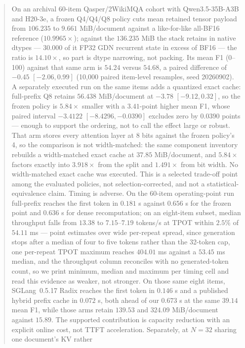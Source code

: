 \documentclass{article}
\begin{document}
\begin{abstract}
On an archival 60-item Qasper/2WikiMQA cohort with Qwen3.5-35B-A3B and H20-3e, a
frozen Q4/Q4/Q8 policy cuts mean retained tensor payload from $106.235$ to
$9.661$ MiB/document against a like-for-like all-BF16 reference ($10.9965\times$);
against the $136.235$ MiB the stack retains in native dtypes --- $30.000$ of it
FP32 GDN recurrent state in excess of BF16 --- the ratio is $14.10\times$, so
part is dtype narrowing, not packing.  Its mean F1 (0--100) against that same arm is
$54.24$ versus $54.68$, a paired difference of $-0.45$ $[-2.06,0.99]$ (10,000
paired item-level resamples, seed 20260902).  A separately executed run on the
same items adds a quantized exact cache: full-prefix Q8 retains $56.438$
MiB/document at $-3.78$ $[-9.12,0.32]$, so the frozen policy is $5.84\times$
smaller with a $3.41$-point higher mean F1, whose paired interval $-3.4122$
$[-8.4296,-0.0390]$ excludes zero by $0.0390$ points --- enough to support the
ordering, not to call the effect large or robust.  That arm stores every
attention layer at 8 bits against the frozen policy's 4, so the comparison is
not width-matched: the same component inventory rebuilds a width-matched exact
cache at $37.85$ MiB/document, and $5.84\times$ factors exactly into
$3.918\times$ from the split and $1.491\times$ from bit width.  No width-matched
exact cache was executed.  This is a selected
trade-off point among the evaluated policies, not selection-corrected, and not a
statistical-equivalence claim.  Timing is adverse.  On the 60-item
operating-point run full-prefix reaches the first token in $0.181$ s against
$0.656$ s for the frozen point and $0.636$ s for dense recomputation; on an
eight-item subset, median throughput falls from $13.38$ to $7.15$--$7.19$
tokens/s at TPOT within $2.5\%$ of $54.11$ ms --- point estimates over wide
per-repeat spread, since generation stops after a median of four to five tokens
rather than the 32-token cap, one per-repeat TPOT maximum reaches $404.01$ ms
against a $53.45$ ms median, and the throughput column reconciles with no
generated-token count, so we print minimum, median and maximum per timing cell
and read this evidence as weaker, not stronger.  On those same eight items,
SGLang~0.5.17 Radix reaches the first token in $0.146$ s and a published hybrid
prefix cache in $0.072$ s, both ahead of our $0.673$ s at the same $39.14$ mean
F1, while those arms retain $139.53$ and $324.09$ MiB/document against $15.89$.
The supported contribution is capacity reduction with an explicit online cost,
not TTFT acceleration.  Separately, at $N=32$ sharing one document's KV rather

\end{abstract}
\end{document}
